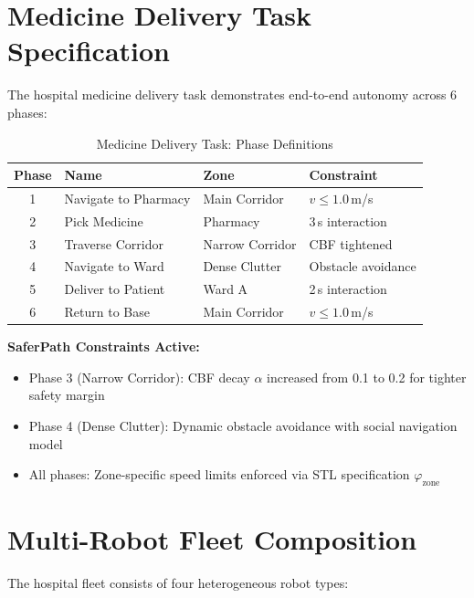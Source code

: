 \documentclass[conference]{IEEEtran}
\begin{document}
\section{Medicine Delivery Task Specification}
\label{sec:supp_delivery}

The hospital medicine delivery task demonstrates end-to-end autonomy across 6 phases:

\begin{table}[h]
\centering
\caption{Medicine Delivery Task: Phase Definitions}
\begin{tabular}{@{}clll@{}}
\toprule
\textbf{Phase} & \textbf{Name} & \textbf{Zone} & \textbf{Constraint} \\
\midrule
1 & Navigate to Pharmacy    & Main Corridor       & $v \leq 1.0$\,m/s \\
2 & Pick Medicine           & Pharmacy            & 3\,s interaction \\
3 & Traverse Corridor       & Narrow Corridor     & CBF tightened \\
4 & Navigate to Ward        & Dense Clutter       & Obstacle avoidance \\
5 & Deliver to Patient      & Ward A              & 2\,s interaction \\
6 & Return to Base          & Main Corridor       & $v \leq 1.0$\,m/s \\
\bottomrule
\end{tabular}
\end{table}

\textbf{SaferPath Constraints Active:}
\begin{itemize}[nosep]
\item Phase 3 (Narrow Corridor): CBF decay $\alpha$ increased from 0.1 to 0.2 for tighter safety margin
\item Phase 4 (Dense Clutter): Dynamic obstacle avoidance with social navigation model
\item All phases: Zone-specific speed limits enforced via STL specification $\varphi_\text{zone}$
\end{itemize}

\section{Multi-Robot Fleet Composition}
\label{sec:supp_fleet_robots}

The hospital fleet consists of four heterogeneous robot types:
\end{document}
